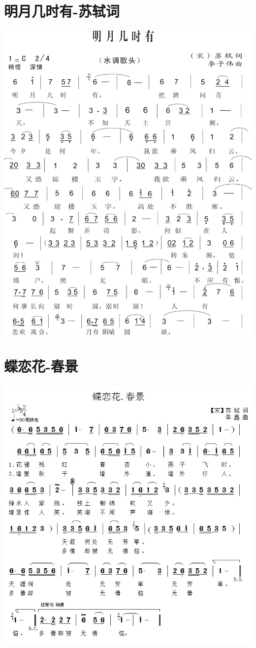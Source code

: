 \documentclass[cn,pad,chinese]{elegantbook}
\begin{document}
\section{明月几时有-苏轼词}
    \includegraphics[width=\textwidth]{dongxiao/20200411-明月几时有.jpg}


\section{蝶恋花-春景}
    \includegraphics[width=\textwidth]{dongxiao/20200411-蝶恋花-春景.jpg}
\end{document}
